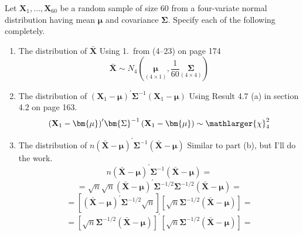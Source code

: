 Let $\textbf{X}_{1}, \dots, \textbf{X}_{60}$ be a random sample of size 60 from a four-variate normal distribution
having mean $\bm{\mu}$ and covariance $\bm{\Sigma}$. Specify each of the following completely.
\begin{enumerate}[label= (\alph*)]
    \item The distribution of $\bar{\textbf{X}}$
    \newline
    \newline
    Using 1.~from (4--23) on page 174
    \[
        \bar{\textbf{X}}
        \sim
        N_{4}\left(\underset{(4 \times 1)}{\bm{\mu}}, \frac{1}{60}\underset{(4 \times 4)}{\bm{\Sigma}}\right)
    \]

    \item The distribution of ${\left(\textbf{X}_{1} - \bm{\mu}\right)}^{\prime}\bm{\Sigma}^{-1}\left(\textbf{X}_{1} - \bm{\mu}\right)$
    \newline
    \newline
    Using Result 4.7 (a) in section 4.2 on page 163.
    \[
        {\left(\textbf{X}_{1} - \bm{\mu}\right)}^{\prime}\bm{\Sigma}^{-1}\left(\textbf{X}_{1} - \bm{\mu}\right)
        \sim
        \mathlarger{\chi}_{4}^{2}
    \]
    \item The distribution of $n{\left(\bar{\textbf{X}} - \bm{\mu}\right)}^{\prime}\bm{\Sigma}^{-1}\left(\bar{\textbf{X}} - \bm{\mu}\right)$
    \newline
    \newline
    Similar to part (b), but I'll do the work.
    \[
        n
        {\left(\bar{\textbf{X}} - \bm{\mu}\right)}^{\prime}
        \bm{\Sigma}^{-1}
        \left(\bar{\textbf{X}} - \bm{\mu}\right)
        =
    \]
    \[
        =
        \sqrt{n}
        \sqrt{n}
        {\left(\bar{\textbf{X}} - \bm{\mu}\right)}^{\prime}
        \bm{\Sigma}^{-1/2}
        \bm{\Sigma}^{-1/2}
        \left(\bar{\textbf{X}} - \bm{\mu}\right)
        =
    \]
    \[
        =
        \left[
            {\left(\bar{\textbf{X}} - \bm{\mu}\right)}^{\prime}
            \bm{\Sigma}^{-1/2}
            \sqrt{n}
        \right]
        \left[
            \sqrt{n}
            \bm{\Sigma}^{-1/2}
            \left(\bar{\textbf{X}} - \bm{\mu}\right)
        \right]
        =
    \]
    \[
        =
        {\left[
            \sqrt{n}
            \bm{\Sigma}^{-1/2}
            \left(\bar{\textbf{X}} - \bm{\mu}\right)
        \right]}^{\prime}
        \left[
            \sqrt{n}
            \bm{\Sigma}^{-1/2}
            \left(\bar{\textbf{X}} - \bm{\mu}\right)
        \right]
        =
    \]
    \[
\]
\end{enumerate}
